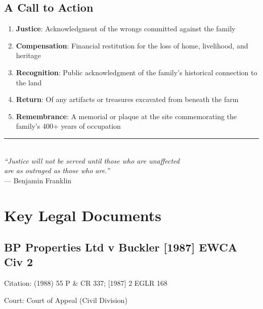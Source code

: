 \documentclass[11pt,a4paper]{article}
\begin{document}
\subsection{A Call to Action}

\begin{tcolorbox}[colback=gold!10,colframe=gold!70!black,title=\textbf{The Buckler Family's Request}]
\begin{enumerate}[label=\arabic*.]
    \item \textbf{Justice}: Acknowledgment of the wrongs committed against the family
    \item \textbf{Compensation}: Financial restitution for the loss of home, livelihood, and heritage
    \item \textbf{Recognition}: Public acknowledgment of the family's historical connection to the land
    \item \textbf{Return}: Of any artifacts or treasures excavated from beneath the farm
    \item \textbf{Remembrance}: A memorial or plaque at the site commemorating the family's 400+ years of occupation
\end{enumerate}
\end{tcolorbox}

\vspace{1cm}

\begin{center}
\rule{0.6\textwidth}{0.5pt}\\[0.5cm]
{\large\itshape ``Justice will not be served until those who are unaffected\\
are as outraged as those who are.''}\\[0.3cm]
--- Benjamin Franklin
\end{center}

\newpage

\appendix

\section{Key Legal Documents}

\subsection{BP Properties Ltd v Buckler [1987] EWCA Civ 2}

Citation: (1988) 55 P \& CR 337; [1987] 2 EGLR 168

Court: Court of Appeal (Civil Division)
\end{document}
